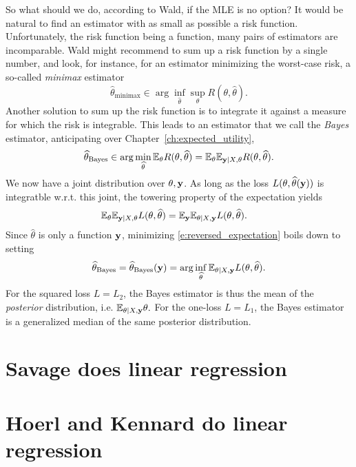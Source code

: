 So what should we do, according to Wald, if the MLE is no option? 
It would be natural to find an estimator with as small as possible a risk function.
Unfortunately, the risk function being a function, many pairs of estimators are incomparable. 
Wald might recommend to sum up a risk function by a single number, and look, for instance, for an estimator minimizing the worst-case risk, a so-called \emph{minimax} estimator
\begin{equation}
    \widehat\theta_{\text{minimax}} \in \arg\inf_{\widehat{\theta}} \sup_\theta R(\theta,\widehat{\theta}).
    \label{e:minimax_estimator_for_regression}
\end{equation}
Another solution to sum up the risk function is to integrate it against a measure for which the risk is integrable. 
This leads to an estimator that we call the \emph{Bayes} estimator, anticipating over Chapter~\ref{ch:expected_utility},
\begin{equation}
    \widehat{\theta}_{\text{Bayes}} \in \arg\min_{\widehat{\theta}} \mathbb{E}_\theta R(\theta,\widehat{\theta}) = \mathbb{E}_\theta \mathbb{E}_{\mathbf{y}\vert X,\theta} R(\theta,\widehat{\theta}).
    \label{e:bayes_estimator_for_regression}
\end{equation}
We now have a joint distribution over $\theta,\mathbf{y}$. 
As long as the loss $L(\theta,\widehat{\theta}(\mathbf{y}))$ is integratble w.r.t. this joint, the towering property of the expectation yields
\begin{align}
    \mathbb{E}_\theta \mathbb{E}_{\mathbf{y}\vert X,\theta} L(\theta,\widehat{\theta}) 
    &= \mathbb{E}_{\mathbf{y}} \mathbb{E}_{\theta\vert X,\mathbf{y}} L(\theta,\widehat{\theta}).
\label{e:reversed_expectation}
\end{align}
Since $\widehat{\theta}$ is only a function $\mathbf{y}$, minimizing \eqref{e:reversed_expectation} boils down to setting 
$$
\widehat{\theta}_{\text{Bayes}} = \widehat{\theta}_{\text{Bayes}}(\mathbf{y}) = \arg\inf_{\widehat{\theta}} \mathbb{E}_{\theta\vert X,\mathbf{y}} L(\theta,\widehat{\theta}).
$$
For the squared loss $L=L_2$, the Bayes estimator is thus the mean of the \emph{posterior} distribution, i.e. 
$
\mathbb{E}_{\theta\vert X,\mathbf{y}} \theta. 
$
For the one-loss $L=L_1$, the Bayes estimator is a generalized median of the same posterior distribution.

\section{Savage does linear regression}
\label{ch:bayesian_regression}

\section{Hoerl and Kennard do linear regression}
\label{ch:penalized_regression}
